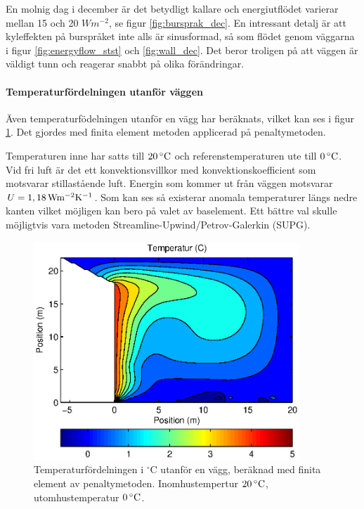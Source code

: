  En molnig dag  i december är det betydligt kallare och energiutflödet varierar mellan 15 och 20 $\unit{W m^{-2}}$, se figur \ref{fig:bursprak_dec}. En intressant detalj är att kyleffekten på burspråket inte alls är sinusformad, så som flödet genom väggarna i figur \ref{fig:energyflow_stst} och \ref{fig:wall_dec}. Det beror troligen på att väggen är väldigt tunn och reagerar snabbt på olika förändringar.

\paragraph{Temperaturfördelningen utanför väggen}

Även temperaturfödelningen utanför en vägg har beräknats, vilket kan ses i figur \ref{fig:temp_dist}. Det gjordes med finita element metoden applicerad på penaltymetoden.

Temperaturen inne har satts till $\unit[20]{^\circ C}$ och referenstemperaturen ute till 
$\unit[0]{^\circ C}$. Vid fri luft är det ett konvektionsvillkor med konvektionskoefficient 
som motsvarar stillastående luft. Energin som kommer ut från väggen motsvarar 
$U = \unit[1,18]{Wm^{-2}K^{-1}}$. Som kan ses så existerar anomala temperaturer längs 
nedre kanten vilket möjligen kan bero på valet av baselement. Ett bättre val skulle möjligtvis vara metoden Streamline-Upwind/Petrov-Galerkin (SUPG).


\begin{figure}[hpbt]
\centering
\includegraphics[width=10cm]{images/convectemperature.eps}
\caption{\label{fig:temp_dist}Temperaturfördelningen i $^\circ\mbox{C}$ utanför en vägg, beräknad med finita element av penaltymetoden. Inomhustempertur $\unit[20]{^\circ C}$, utomhustemperatur $\unit[0]{^\circ C}$.}
\end{figure}

